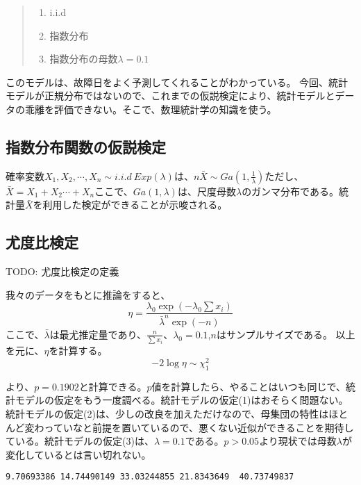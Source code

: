 \documentclass[a4paper,11pt,dvipdfmx]{jsarticle}
\begin{document}
\begin{quote}
    \begin{enumerate}[(1)]
\item i.i.d
\item 指数分布
\item 指数分布の母数$\lambda=0.1$
\end{enumerate}
\end{quote}
このモデルは、故障日をよく予測してくれることがわかっている。
今回、統計モデルが正規分布ではないので、これまでの仮説検定により、統計モデルとデータの乖離を評価できない。そこで、数理統計学の知識を使う。

\subsection{指数分布関数の仮説検定}
確率変数$X_1,X_2,\cdots,X_n \sim i.i.d \ Exp(\lambda)$は、$n\bar{X}\sim Ga(1,\frac{1}{\lambda}) $ただし、$\bar{X}=X_1+X_2 \cdots +X_n$ここで、$Ga(1,\lambda)$は、尺度母数$\lambda$のガンマ分布である。統計量$\bar{X}$を利用した検定ができることが示唆される。



\subsection{尤度比検定}
TODO: 尤度比検定の定義

我々のデータをもとに推論をすると、
$$
\eta= \frac{\lambda_0\exp\left({-\lambda_0\sum x_i}\right)}{\bar{\lambda}^n \exp{(-n)}}
$$
ここで、$\bar{\lambda}$は最尤推定量であり、$\frac{n}{\sum x_i}$、$\lambda_0=0.1$,$n$はサンプルサイズである。
以上を元に、$\eta$を計算する。
$$
-2\log \eta \sim \chi^2_1
$$

より、$p=0.1902$と計算できる。$p$値を計算したら、やることはいつも同じで、統計モデルの仮定をもう一度調べる。統計モデルの仮定(1)はおそらく問題ない。統計モデルの仮定(2)は、少しの改良を加えただけなので、母集団の特性はほとんど変わっていなと前提を置いているので、悪くない近似ができることを期待している。統計モデルの仮定(3)は、$\lambda=0.1$である。$p>0.05$より現状では母数$\lambda$が変化しているとは言い切れない。




\begin{lstlisting}
9.70693386 14.74490149 33.03244855 21.8343649  40.73749837
\end{lstlisting}
\end{document}
